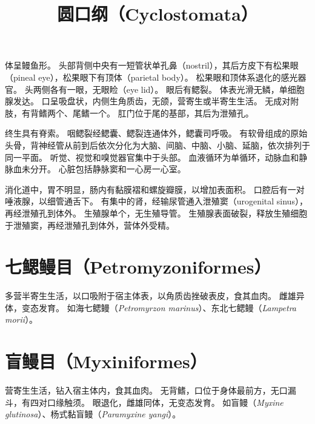 \documentclass[11pt]{article}
\title{圆口纲（Cyclostomata）}
\date{}
\begin{document}
  \maketitle

  \linenumbers
体呈鳗鱼形。
头部背侧中央有一短管状单孔鼻（nostril），其后方皮下有松果眼（pineal eye），松果眼下有顶体（parietal body）。
松果眼和顶体系退化的感光器官。
头两侧各有一眼，无眼睑（eye lid）。
眼后有鳃裂。
体表光滑无鳞，单细胞腺发达。
口呈吸盘状，内侧生角质齿，无颌，营寄生或半寄生生活。
无成对附肢，有背鳍两个、尾鳍一个。
肛门位于尾的基部，其后为泄殖孔。

\newline

终生具有脊索。
咽鳃裂经鳃囊、鳃裂连通体外，鳃囊司呼吸。
有软骨组成的原始头骨，背神经管从前到后依次分化为大脑、间脑、中脑、小脑、延脑，依次排列于同一平面。
听觉、视觉和嗅觉器官集中于头部。
血液循环为单循环，动脉血和静脉血未分开。
心脏包括静脉窦和一心房一心室。

\newline

消化道中，胃不明显，肠内有黏膜褶和螺旋瓣膜，以增加表面积。
口腔后有一对唾液腺，以细管通舌下。
有集中的肾，经输尿管通入泄殖窦（urogenital sinus），再经泄殖孔到体外。
生殖腺单个，无生殖导管。
生殖腺表面破裂，释放生殖细胞于泄殖窦，再经泄殖孔到体外，营体外受精。
  
\section{七鳃鳗目（Petromyzoniformes）}
多营半寄生生活，以口吸附于宿主体表，以角质齿挫破表皮，食其血肉。
雌雄异体，变态发育。
如海七鳃鳗（\textit{Petromyrzon marinus}）、东北七鳃鳗（\textit{Lampetra morii}）。

\section{盲鳗目（Myxiniformes）}
营寄生生活，钻入宿主体内，食其血肉。
无背鳍，口位于身体最前方，无口漏斗，有四对口缘触须。
眼退化，雌雄同体，无变态发育。
如盲鳗（\textit{Myxine glutinosa}）、杨式黏盲鳗（\textit{Paramyxine yangi}）。
\end{document}
